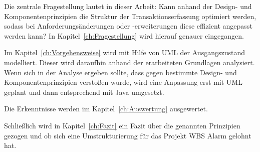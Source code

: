 Die zentrale Fragestellung lautet in dieser Arbeit: Kann anhand der Design- und Komponentenprinzipien die Struktur der Transaktionserfassung optimiert werden, sodass bei Anforderungsänderungen oder ‑erweiterungen diese effizient angepasst werden kann? In Kapitel~\ref{ch:Fragestellung} wird hierauf genauer eingegangen.

Im Kapitel~\ref{ch:Vorgehensweise} wird mit Hilfe von UML der Ausgangszustand modelliert. Dieser wird daraufhin anhand der erarbeiteten Grundlagen analysiert. Wenn sich in der Analyse ergeben sollte, dass gegen bestimmte Design- und Komponentenprinzipien verstoßen wurde, wird eine Anpassung erst mit UML geplant und dann entsprechend mit Java umgesetzt.

Die Erkenntnisse werden im Kapitel~\ref{ch:Auswertung} ausgewertet.

Schließlich wird in Kapitel~\ref{ch:Fazit} ein Fazit über die genannten Prinzipien gezogen und ob sich eine Umstrukturierung für das Projekt WBS Alarm gelohnt hat.